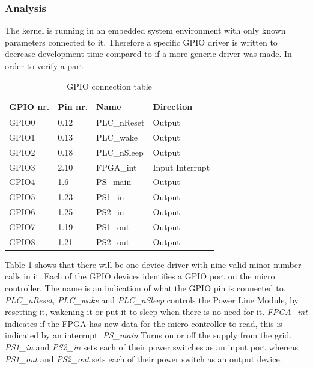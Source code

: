 \subsubsection{Analysis}
The kernel is running in an embedded system environment with only known parameters connected to it. Therefore a specific GPIO driver is written to decrease development time compared to if a more generic driver was made.
\p In order to verify a part
\begin{table}[H]
	\centering
	\begin{tabular}{|p{2cm}|p{2cm}|p{3cm}|p{3cm}|}\hline
		GPIO nr.		& Pin nr.		& Name			& Direction		\\\hline
		GPIO0		& 0.12		& PLC\_nReset		& Output			\\\hline
		GPIO1		& 0.13		& PLC\_wake		& Output			\\\hline
		GPIO2		& 0.18		& PLC\_nSleep		& Output			\\\hline
		GPIO3		& 2.10		& FPGA\_int		& Input Interrupt	\\\hline
		GPIO4		& 1.6			& PS\_main		& Output			\\\hline
		GPIO5		& 1.23		& PS1\_in			& Output			\\\hline
		GPIO6		& 1.25		& PS2\_in			& Output			\\\hline
		GPIO7		& 1.19		& PS1\_out		& Output			\\\hline
		GPIO8		& 1.21		& PS2\_out		& Output			\\\hline
	\end{tabular}
	\caption{GPIO connection table}
	\label{tab:gpio_table}
\end{table}
Table \ref{tab:gpio_table} shows that there will be one device driver with nine valid minor number calls in it. Each of the GPIO devices identifies a GPIO port on the micro controller. The name is an indication of what the GPIO pin is connected to. 
\p \textit{PLC\_nReset}, \textit{PLC\_wake} and \textit{PLC\_nSleep} controls the Power Line Module, by resetting it, wakening it or put it to sleep when there is no need for it.
\p \textit{FPGA\_int} indicates if the FPGA has new data for the micro controller to read, this is indicated by an interrupt.
\p \textit{PS\_main} Turns on or off the supply from the grid.
\p \textit{PS1\_in} and \textit{PS2\_in} sets each of their power switches as an input port whereas \textit{PS1\_out} and \textit{PS2\_out} sets each of their power switch as an output device.        
%
%
